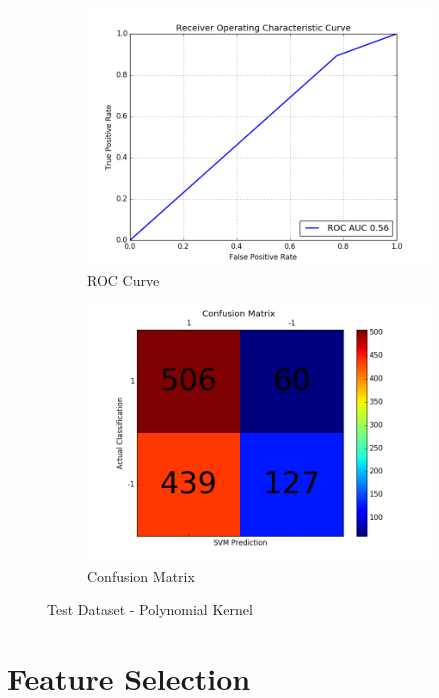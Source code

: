 \begin{figure}[h]
	
	\begin{subfigure}{0.5\textwidth}
		\includegraphics[width=0.9\linewidth]{images/AUC-TestDataset-poly} 
		\caption{ROC Curve}
		\label{fig:AUC_TestDataset_poly}
	\end{subfigure}
	\begin{subfigure}{0.5\textwidth}
		\includegraphics[width=0.9\linewidth]{images/CM-TestDataset-poly}
		\caption{Confusion Matrix}
		\label{fig:CM_TestDataset_poly}
	\end{subfigure}
	
	\caption{Test Dataset - Polynomial Kernel}
	\label{fig:TestDataset_poly_results}
\end{figure}



\section{Feature Selection}



